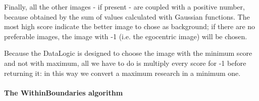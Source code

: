 %
Finally, all the other images - if present - are coupled with a positive number, because obtained by the sum of
values calculated with Gaussian functions. The most high score indicate the better image to chose as background;
if there are no preferable images, the image with -1 (i.e. the egocentric image) will be chosen.
%

%
Because the DataLogic is designed to choose the image with the minimum score and not with maximum, all we have to
do is multiply every score for -1 before returning it: in this way we convert a maximum research in a minimum one.
%

%
\paragraph{The WithinBoundaries algorithm}

